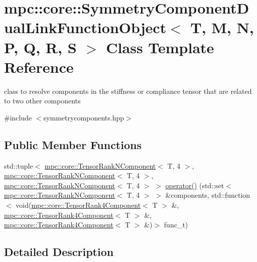 \hypertarget{structmpc_1_1core_1_1_symmetry_component_dual_link_function_object}{}\section{mpc\+:\+:core\+:\+:Symmetry\+Component\+Dual\+Link\+Function\+Object$<$ T, M, N, P, Q, R, S $>$ Class Template Reference}
\label{structmpc_1_1core_1_1_symmetry_component_dual_link_function_object}


class to resolve components in the stiffness or compliance tensor that are related to two other components  




{\ttfamily \#include $<$symmetrycomponents.\+hpp$>$}

\subsection*{Public Member Functions}
\begin{DoxyCompactItemize}
\item 
std\+::tuple$<$ \mbox{\hyperlink{classmpc_1_1core_1_1_tensor_rank_n_component}{mpc\+::core\+::\+Tensor\+Rank\+N\+Component}}$<$ T, 4 $>$, \mbox{\hyperlink{classmpc_1_1core_1_1_tensor_rank_n_component}{mpc\+::core\+::\+Tensor\+Rank\+N\+Component}}$<$ T, 4 $>$, \mbox{\hyperlink{classmpc_1_1core_1_1_tensor_rank_n_component}{mpc\+::core\+::\+Tensor\+Rank\+N\+Component}}$<$ T, 4 $>$ $>$ \mbox{\hyperlink{structmpc_1_1core_1_1_symmetry_component_dual_link_function_object_a7dfea4f0c6734f22299495c5d0e92ef7}{operator()}} (std\+::set$<$ \mbox{\hyperlink{classmpc_1_1core_1_1_tensor_rank_n_component}{mpc\+::core\+::\+Tensor\+Rank\+N\+Component}}$<$ T, 4 $>$ $>$ \&components, std\+::function$<$ void(\mbox{\hyperlink{namespacempc_1_1core_ac3a232afc7c680d580628e834030482f}{mpc\+::core\+::\+Tensor\+Rank4\+Component}}$<$ T $>$ \&, \mbox{\hyperlink{namespacempc_1_1core_ac3a232afc7c680d580628e834030482f}{mpc\+::core\+::\+Tensor\+Rank4\+Component}}$<$ T $>$ \&, \mbox{\hyperlink{namespacempc_1_1core_ac3a232afc7c680d580628e834030482f}{mpc\+::core\+::\+Tensor\+Rank4\+Component}}$<$ T $>$ \&)$>$ func\+\_\+t)
\end{DoxyCompactItemize}


\subsection{Detailed Description}

